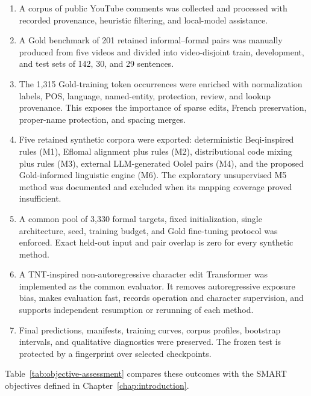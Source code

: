 \documentclass[12pt, a4paper, twoside, openany]{report}
\begin{document}
\begin{enumerate}
	\item A corpus of public YouTube comments was collected and processed with recorded provenance, heuristic filtering, and local-model assistance.
	\item A Gold benchmark of 201 retained informal--formal pairs was manually produced from five videos and divided into video-disjoint train, development, and test sets of 142, 30, and 29 sentences.
	\item The 1,315 Gold-training token occurrences were enriched with normalization labels, POS, language, named-entity, protection, review, and lookup provenance. This exposes the importance of sparse edits, French preservation, proper-name protection, and spacing merges.
	\item Five retained synthetic corpora were exported: deterministic Beqi-inspired rules (M1), Eflomal alignment plus rules (M2), distributional code mixing plus rules (M3), external LLM-generated Oolel pairs (M4), and the proposed Gold-informed linguistic engine (M6). The exploratory unsupervised M5 method was documented and excluded when its mapping coverage proved insufficient.
	\item A common pool of 3,330 formal targets, fixed initialization, single architecture, seed, training budget, and Gold fine-tuning protocol was enforced. Exact held-out input and pair overlap is zero for every synthetic method.
	\item A TNT-inspired non-autoregressive character edit Transformer was implemented as the common evaluator. It removes autoregressive exposure bias, makes evaluation fast, records operation and character supervision, and supports independent resumption or rerunning of each method.
	\item Final predictions, manifests, training curves, corpus profiles, bootstrap intervals, and qualitative diagnostics were preserved. The frozen test is protected by a fingerprint over selected checkpoints.
\end{enumerate}

Table~\ref{tab:objective-assessment} compares these outcomes with the SMART objectives defined in Chapter~\ref{chap:introduction}.
\end{document}
